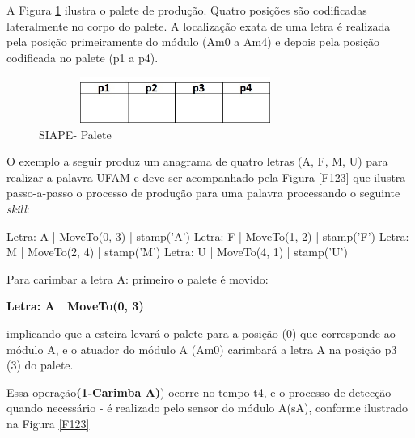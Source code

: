 \documentclass[10pt,letterpaper,twocolumn]{IEEEtran}
\begin{document}
					A Figura \ref{F121} ilustra o palete de produção. Quatro posições são codificadas lateralmente no corpo do palete. A localização exata de uma letra é realizada pela posição primeiramente do módulo (Am0 a Am4) e depois pela posição codificada no palete (p1 a p4).
					
					\begin{figure}[h]
						\centering
						\includegraphics[width=8.9cm, height=1.5cm]{MeDSE_imagens/F121_SIAPE_PALETE.jpg} 
						\caption{SIAPE- Palete}
						\label{F121}
					\end{figure}
					
					O exemplo a seguir produz um anagrama de quatro letras (A, F, M, U) para realizar a palavra UFAM e deve ser acompanhado pela Figura \ref{F123} que ilustra passo-a-passo o processo de produção para uma palavra processando o seguinte \textit{skill}: 
					
					Letra: A | MoveTo(0, 3) | stamp('A')
					Letra: F | MoveTo(1, 2) | stamp('F')
					Letra: M | MoveTo(2, 4) | stamp('M')
					Letra: U | MoveTo(4, 1) | stamp('U')
					
					Para carimbar a letra A:  primeiro o palete é movido:
					\begin{center}
						\textbf{Letra: A | MoveTo(0, 3)}
					\end{center}
					implicando que a esteira levará o palete para a posição (0) que corresponde ao módulo A, e o atuador do módulo A (Am0) carimbará a letra A na posição p3 (3) do palete. 
					
					Essa operação\textbf{(1-Carimba A)}) ocorre no tempo t4, e o processo de detecção - quando necessário - é realizado pelo sensor do módulo A(sA), conforme ilustrado na Figura \ref{F123}
					
\end{document}
